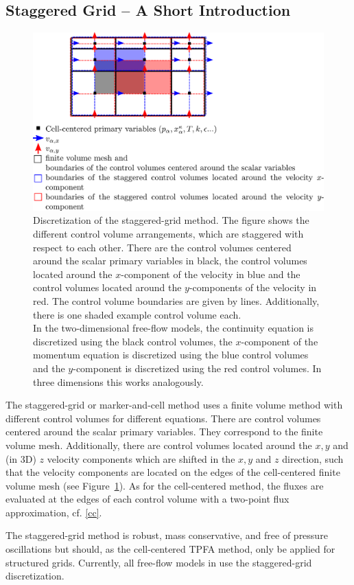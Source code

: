 \subsection{Staggered Grid -- A Short Introduction}\label{staggered}

\begin{figure}[ht]
\centering
\includegraphics[width=.8\linewidth]{./pdf/staggered_grid.pdf}
\caption{\label{pc:staggered} Discretization of the staggered-grid method. The figure shows the different control volume arrangements, which are staggered with respect to each other. There are the control volumes centered around the scalar primary variables in black, the control volumes located around the $x$-component of the velocity in blue and the control volumes located around the $y$-components of the velocity in red. The control volume boundaries are given by lines. Additionally, there is one shaded example control volume each.\\
In the two-dimensional free-flow models, the continuity equation is discretized using the black control volumes, the $x$-component of the momentum equation is discretized using the blue control volumes and the $y$-component is discretized using the red control volumes. In three dimensions this works analogously.}
\end{figure}

The staggered-grid or marker-and-cell method uses a finite volume method with different control volumes for different equations. There are control volumes centered around the scalar primary variables. They correspond to the finite volume mesh. Additionally, there are control volumes located around the $x,y$ and (in 3D) $z$ velocity components which are shifted in the $x,y$ and $z$ direction, such that the velocity components are located on the edges of the cell-centered finite volume mesh (see Figure~\ref{pc:staggered}). As for the cell-centered method, the fluxes are evaluated at the edges of each control volume with a two-point flux approximation, cf. \ref{cc}.\par
The staggered-grid method is robust, mass conservative, and free of pressure oscillations
but should, as the cell-centered TPFA method, only be applied for structured grids.
Currently, all free-flow models in \Dumux use the staggered-grid discretization.
